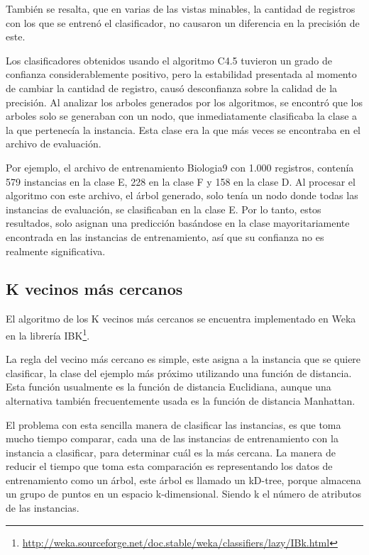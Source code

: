 También se resalta, que en varias de las vistas minables, la cantidad de registros con los que se entrenó el clasificador, no causaron un diferencia en la precisión de este.

Los clasificadores obtenidos usando el algoritmo C4.5 tuvieron un grado de confianza considerablemente positivo, pero la estabilidad presentada al momento de cambiar la cantidad de registro, causó desconfianza sobre la calidad de la precisión. 
Al analizar los arboles generados por los algoritmos, se encontró que los arboles solo se generaban con un nodo, que inmediatamente clasificaba la clase a la que pertenecía la instancia. Esta clase era la que más veces se encontraba en el archivo de evaluación.

Por ejemplo, el archivo de entrenamiento Biologia9 con 1.000 registros, contenía 579 instancias en la clase E, 228 en la clase F y 158 en la clase D. Al procesar el algoritmo con este archivo, el árbol generado, solo tenía un nodo donde todas las instancias de evaluación, se clasificaban en la clase E. Por lo tanto, estos resultados, solo asignan una predicción basándose en la clase mayoritariamente encontrada en las instancias de entrenamiento, así que su confianza no es realmente significativa.\\
\subsection{K vecinos más cercanos}
El algoritmo de los K vecinos más cercanos se encuentra implementado en Weka en la librería IBK\footnote{\url{http://weka.sourceforge.net/doc.stable/weka/classifiers/lazy/IBk.html}}.

La regla del vecino más cercano es simple, este asigna a la instancia que se quiere clasificar, la clase del ejemplo más próximo utilizando una función de distancia. Esta función usualmente es la función de distancia Euclidiana, aunque una alternativa también frecuentemente usada es la función de distancia Manhattan.

El problema con esta sencilla manera de clasificar las instancias, es que toma mucho tiempo comparar, cada una de las instancias de entrenamiento con la instancia a clasificar, para determinar cuál es la más cercana. La manera de reducir el tiempo que toma esta comparación es representando los datos de entrenamiento como un árbol, este árbol es llamado un kD-tree\cite{key-220}, porque almacena un grupo de puntos en un espacio k-dimensional. Siendo k el número de atributos de las instancias.

